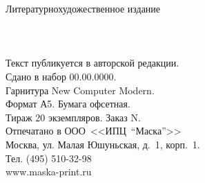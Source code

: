 {
\newpage
\thispagestyle{empty}
\begin{center}
{\small Литературно\sdash художественное издание}\\
\vspace{2.0cm}
{\Large \MyVarAuthorName}\\
\vspace{2.0cm}
{\Large\textbf\MyVarBookName}\\
\vspace{0.4cm}
{\Large\textbf\MyVarBookNamesec}\\
\vspace{2.5cm}
{\small%
Текст публикуется в авторской редакции.\\
\vspace{2.5cm}
Сдано в набор 00.00.0000.\\
Гарнитура New Computer Modern.\\
Формат А5. Бумага офсетная.\\
Тираж 20 экземпляров. Заказ N.\\
\vspace{1.0cm}
Отпечатано в ООО~<<ИПЦ~"`Маска"'>>\\
Москва, ул. Малая Юшуньская, д.~1, корп.~1.\\
Тел. (495) 510-32-98\\
www.maska-print.ru
}
\end{center}
}